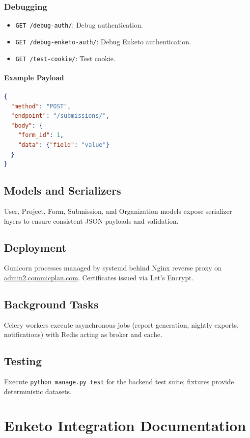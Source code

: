 \documentclass[11pt]{article}
\begin{document}
\subsubsection{Debugging}
\begin{itemize}[leftmargin=*]
  \item \verb|GET /debug-auth/|: Debug authentication.
  \item \verb|GET /debug-enketo-auth/|: Debug Enketo authentication.
  \item \verb|GET /test-cookie/|: Test cookie.
\end{itemize}

\paragraph{Example Payload}
\begin{lstlisting}[language=json]
{
  "method": "POST",
  "endpoint": "/submissions/",
  "body": {
    "form_id": 1,
    "data": {"field": "value"}
  }
}
\end{lstlisting}

\subsection{Models and Serializers}
User, Project, Form, Submission, and Organization models expose serializer layers to ensure consistent JSON payloads and validation.

\subsection{Deployment}
Gunicorn processes managed by systemd behind Nginx reverse proxy on \href{https://admin2.commicplan.com}{admin2.commicplan.com}. Certificates issued via Let's Encrypt.

\subsection{Background Tasks}
Celery workers execute asynchronous jobs (report generation, nightly exports, notifications) with Redis acting as broker and cache.

\subsection{Testing}
Execute \verb|python manage.py test| for the backend test suite; fixtures provide deterministic datasets.

\section{Enketo Integration Documentation}
\end{document}
